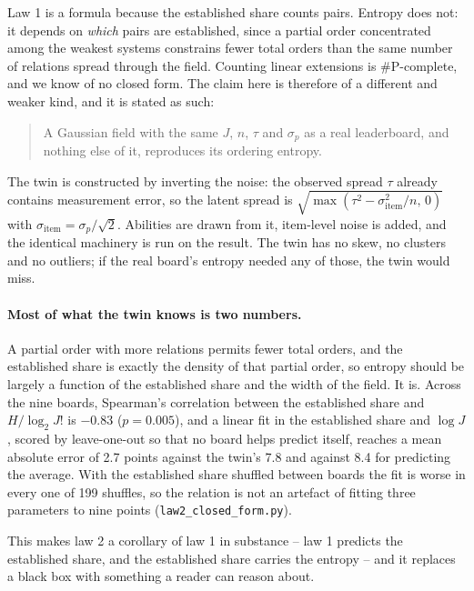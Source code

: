 \documentclass[10pt]{article}
\begin{document}
Law 1 is a formula because the established share counts pairs. Entropy
does not: it depends on \emph{which} pairs are established, since a partial
order concentrated among the weakest systems constrains fewer total orders
than the same number of relations spread through the field. Counting linear
extensions is \#P-complete, and we know of no closed form. The claim here is
therefore of a different and weaker kind, and it is stated as such:

\begin{quote}
A Gaussian field with the same $J$, $n$, $\tau$ and $\sigma_p$ as a real
leaderboard, and nothing else of it, reproduces its ordering entropy.
\end{quote}

The twin is constructed by inverting the noise: the observed spread $\tau$
already contains measurement error, so the latent spread is
$\sqrt{\max(\tau^2 - \sigma_{\mathrm{item}}^2/n,\,0)}$ with
$\sigma_{\mathrm{item}} = \sigma_p/\sqrt{2}$. Abilities are drawn from it,
item-level noise is added, and the identical machinery is run on the result.
The twin has no skew, no clusters and no outliers; if the real board's
entropy needed any of those, the twin would miss.

\paragraph{Most of what the twin knows is two numbers.} A partial order with
more relations permits fewer total orders, and the established share is
exactly the density of that partial order, so entropy should be largely a
function of the established share and the width of the field. It is. Across
the nine boards, Spearman's correlation between the established share and
$H/\log_2 J!$ is $-0.83$ ($p = 0.005$), and a linear fit in the established
share and $\log J$, scored by leave-one-out so that no board helps predict
itself, reaches a mean absolute error of 2.7 points against the twin's 7.8
and against 8.4 for predicting the average. With the established share
shuffled between boards the fit is worse in every one of 199 shuffles, so
the relation is not an artefact of fitting three parameters to nine points
(\texttt{law2\_closed\_form.py}).

This makes law 2 a corollary of law 1 in substance -- law 1 predicts the
established share, and the established share carries the entropy -- and it
replaces a black box with something a reader can reason about.
\end{document}
